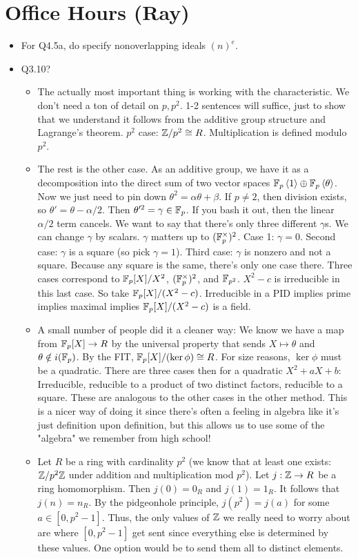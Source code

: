 \documentclass[../notes.tex]{subfiles}
\begin{document}
\section{Office Hours (Ray)}
\begin{itemize}
    \item For Q4.5a, do specify nonoverlapping ideals $(n)^e$.
    \item Q3.10?
    \begin{itemize}
        \item The actually most important thing is working with the characteristic. We don't need a ton of detail on $p,p^2$. 1-2 sentences will suffice, just to show that we understand it follows from the additive group structure and Lagrange's theorem. $p^2$ case: $\mathbb{Z}/p^2\cong R$. Multiplication is defined modulo $p^2$.
        \item The rest is the other case. As an additive group, we have it as a decomposition into the direct sum of two vector spaces $\mathbb{F}_p\left\langle{1}\right\rangle\oplus\mathbb{F}_p\left\langle{\theta}\right\rangle$. Now we just need to pin down $\theta^2=\alpha\theta+\beta$. If $p\neq 2$, then division exists, so $\theta'=\theta-\alpha/2$. Then $\theta'^2=\gamma\in\mathbb{F}_p$. If you bash it out, then the linear $\alpha/2$ term cancels. We want to say that there's only three different $\gamma$s. We can change $\gamma$ by scalars. $\gamma$ matters up to $(\mathbb{F}_p^\times)^2$. Case 1: $\gamma=0$. Second case: $\gamma$ is a square (so pick $\gamma=1$). Third case: $\gamma$ is nonzero and not a square. Because any square is the same, there's only one case there. Three cases correspond to $\mathbb{F}_p[X]/X^2$, $(\mathbb{F}_p^\times)^2$, and $\mathbb{F}_{p^2}$. $X^2-c$ is irreducible in this last case. So take $\mathbb{F}_p[X]/(X^2-c)$. Irreducible in a PID implies prime implies maximal implies $\mathbb{F}_p[X]/(X^2-c)$ is a field.
        \item A small number of people did it a cleaner way: We know we have a map from $\mathbb{F}_p[X]\to R$ by the universal property that sends $X\mapsto\theta$ and $\theta\notin i(\mathbb{F}_p)$. By the FIT, $\mathbb{F}_p[X]/(\ker\phi)\cong R$. For size reasons, $\ker\phi$ must be a quadratic. There are three cases then for a quadratic $X^2+aX+b$: Irreducible, reducible to a product of two distinct factors, reducible to a square. These are analogous to the other cases in the other method. This is a nicer way of doing it since there's often a feeling in algebra like it's just definition upon definition, but this allows us to use some of the "algebra" we remember from high school!
        \item Let $R$ be a ring with cardinality $p^2$ (we know that at least one exists: $\mathbb{Z}/p^2\mathbb{Z}$ under addition and multiplication mod $p^2$). Let $j:\mathbb{Z}\to R$ be a ring homomorphism. Then $j(0)=0_R$ and $j(1)=1_R$. It follows that $j(n)=n_R$. By the pidgeonhole principle, $j(p^2)=j(a)$ for some $a\in[0,p^2-1]$. Thus, the only values of $\mathbb{Z}$ we really need to worry about are where $[0,p^2-1]$ get sent since everything else is determined by these values. One option would be to send them all to distinct elements.

\end{itemize}
\end{itemize}
\end{document}

